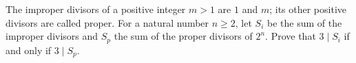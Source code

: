 The improper divisors of a positive integer $m>1$ are $1$ and $m$; its other positive divisors are called proper. For a natural number $n\ge2$, let $S_i$ be the sum of the improper divisors and $S_p$ the sum of the proper divisors of $2^n$. Prove that $3\mid S_i$ if and only if $3\mid S_p$.
